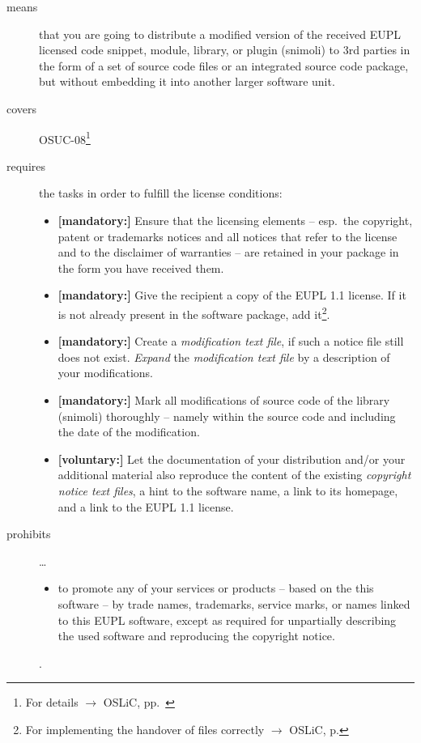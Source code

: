 \begin{description}
\item[means] that you are going to distribute a modified version of the received
EUPL licensed code snippet, module, library, or plugin (snimoli) to 3rd
parties in the form of a set of source code files or an integrated source code
package, but without embedding it into another larger software unit.
\item[covers] OSUC-08\footnote{For details $\rightarrow$ OSLiC, pp.\ \pageref{OSUC-08-DEF}}
\item[requires] the tasks in order to fulfill the license conditions:
\begin{itemize}
  
  \item \textbf{[mandatory:]} Ensure that the licensing elements -- esp.\ the
  copyright, patent or trademarks notices and all notices that refer to the
  license and to the disclaimer of warranties -- are retained in your package in
  the form you have received them.
  
  \item \textbf{[mandatory:]} Give the recipient a copy of the EUPL 1.1
  license. If it is not already present in the software package, add
  it\footnote{For implementing the handover of files correctly $\rightarrow$
  OSLiC, p. \pageref{DistributingFilesHint}}.

  \item \textbf{[mandatory:]} Create a \emph{modification text file}, if such a
  notice file still does not exist. \emph{Expand} the \emph{modification text
  file} by a description of your modifications.
  
  \item \textbf{[mandatory:]} Mark all modifications of source code of the
  library (snimoli) thoroughly -- namely within the source code and including
  the date of the modification.
   
  \item \textbf{[voluntary:]} Let the documentation of your distribution and/or
  your additional material  also reproduce the content of the existing
  \emph{copyright notice text files}, a hint to the software name, a link to its
  homepage, and a link to the EUPL 1.1 license.

\end{itemize}

\item[prohibits] \ldots
\begin{itemize}
  \item to promote any of your services or products – based on the this software
  – by trade names, trademarks, service marks, or names linked to this EUPL
  software, except as required for unpartially describing the used software and
  reproducing the copyright notice.
\end{itemize}.

\end{description}



